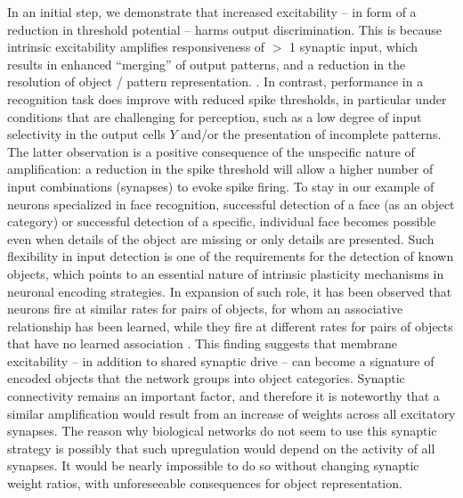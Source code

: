 In an initial step, we demonstrate that increased excitability
        -- in form of a reduction in threshold potential --
        harms output discrimination.
    This is because intrinsic excitability amplifies responsiveness of $>$ 1 synaptic input,
        which results in enhanced ``merging'' of output patterns,
        and  a reduction in the resolution of object / pattern representation.
        .
    In contrast, performance in a recognition task does improve with reduced spike thresholds,
        in particular under conditions that are challenging for perception,
        such as a low degree of input selectivity in the output cells $Y$ and/or the presentation of incomplete patterns.
    The latter observation is a positive consequence of the unspecific nature of amplification:
        a reduction in the spike threshold will allow a higher number of input combinations (synapses) to evoke spike firing.
    To stay in our example of neurons specialized in face recognition,
        successful detection of a face (as an object category)
        or successful detection of a specific, individual face
        becomes possible even when details of the object are missing or only details are presented.
    Such flexibility in input detection is one of the requirements for the detection of known objects,
        which points to an essential nature of intrinsic plasticity mechanisms in neuronal encoding strategies.
    In expansion of such role, it has been observed that neurons fire
        at similar rates for pairs of objects,
            for whom an associative relationship has been learned,
        while they fire at different rates for pairs of objects
            that have no learned association \citep{Freedman2011-bo}.
    This finding suggests that membrane excitability
        -- in addition to shared synaptic drive --
        can become a signature of encoded objects that the network groups into object categories.
    Synaptic connectivity remains an important factor, and therefore it is noteworthy
        that a similar amplification would result from an increase of weights across all excitatory synapses.
    The reason why biological networks do not seem to use this synaptic strategy is possibly
        that such upregulation would depend on the activity of all synapses.
    It would be nearly impossible to do so without changing synaptic weight ratios,
        with unforeseeable consequences for object representation.

